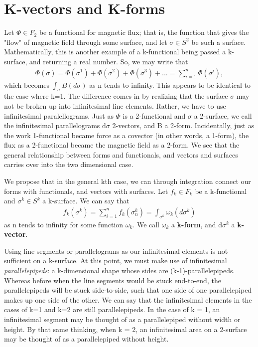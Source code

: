 \documentclass{book}
\begin{document}
\section{K-vectors and K-forms}

Let $\Phi \in F_2$ be a functional for magnetic flux; that is, the function that gives the "flow" of magnetic field through some surface, and let $\sigma \in S^2$ be such a surface. Mathematically, this is another example of a k-functional being passed a k-surface, and returning a real number. So, we may write that \begin{gather}\Phi(\sigma) = \Phi(\sigma^1) + \Phi(\sigma^2) + \Phi(\sigma^3) + ... = \sum_{i=1}^n \Phi(\sigma^i),\end{gather} which becomes $\int_\sigma B(d\sigma)$ as n tends to infinity. This appears to be identical to the case where k=1. The difference comes in by realizing that the surface $\sigma$ may not be broken up into infinitesimal line elements. Rather, we have to use infinitesimal paralellograms. Just as $\Phi$ is a 2-functional and $\sigma$ a 2-surface, we call the infinitesimal parallelograms d$\sigma$ 2-vectors, and B a 2-form. Incidentally, just as the work 1-functional became force as a covector (in other words, a 1-form), the flux as a 2-functional became the magnetic field as a 2-form. We see that the general relationship between forms and functionals, and vectors and surfaces carries over into the two dimensional case.  


We propose that in the general kth case, we can through integration connect our forms with functionals, and vectors with surfaces. Let $f_k \in F_k$ be a k-functional and $\sigma^k \in S^k$ a k-surface. We can say that \begin{gather}f_k(\sigma^k) = \sum_{i=1}^n f_k(\sigma^k_n) = \int_{\sigma^k} \omega_k(d\sigma^k)\end{gather} as n tends to infinity for some function $\omega_k$. We call $\omega_k$ a \textbf{k-form}, and d$\sigma^k$ a \textbf{k-vector}. 

Using line segments or parallelograms as our infinitesimal elements is not sufficient on a k-surface. At this point, we must make use of infinitesimal \emph{parallelepipeds}: a k-dimensional shape whose sides are (k-1)-parallelepipeds. Whereas before when the line segments would be stuck end-to-end, the parallelepipeds will be stuck side-to-side, such that one side of one parallelepiped makes up one side of the other. We can say that the infinitesimal elements in the cases of k=1 and k=2 are still parallelepipeds. In the case of k = 1, an infinitesimal segment may be thought of as a parallelepiped without width or height. By that same thinking, when k = 2, an infinitesimal area on a 2-surface may be thought of as a parallelepiped without height. 
\end{document}

